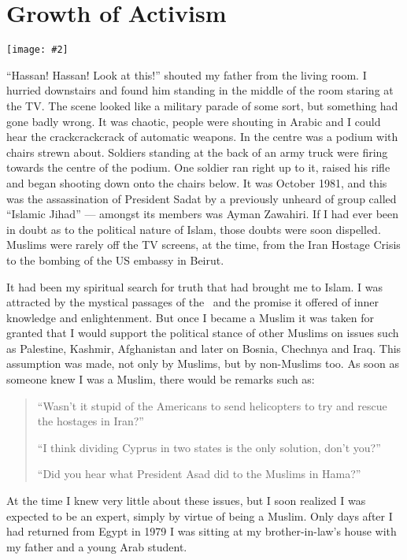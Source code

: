 \documentclass[12pt]{memoir}
\newcommand{\img}[3]{\begin{center}%
\texttt{[image: \#2]}\\{\small\em#3}%
\end{center}}
\begin{document}
\chapter{Growth of Activism}

\img{scale=0.7}{Assassination_of_Sadat.jpg}{}

“Hassan! Hassan! Look at this!”
shouted my father from the living room.
I hurried downstairs and found him standing
in the middle of the room staring at the TV.
The scene looked like a military parade of some sort,
but something had gone badly wrong.
It was chaotic, people were shouting in Arabic
and I could hear the crack\–crack\–crack of automatic weapons.
In the centre was a podium with chairs strewn about.
Soldiers standing at the back of an army truck
were firing towards the centre of the podium.
One soldier ran right up to it,
raised his rifle and began shooting down onto the chairs below.
It was October 1981, and this was the assassination of President Sadat
by a previously unheard of group called “Islamic Jihad” —
amongst its members was Ayman Zawahiri.
If I had ever been in doubt as to the political nature of Islam,
those doubts were soon dispelled.
Muslims were rarely off the TV screens, at the time,
from the Iran Hostage Crisis to the bombing of the US embassy in Beirut.

It had been my spiritual search for truth that had brought me to Islam.
I was attracted by the mystical passages of the \Quran\
and the promise it offered of inner knowledge and enlightenment.
But once I became a Muslim it was taken for granted that I would support
the political stance of other Muslims on issues such as Palestine,
Kashmir, Afghanistan and later on Bosnia, Chechnya and Iraq.
This assumption was made, not only by Muslims, but by non-Muslims too.
As soon as someone knew I was a Muslim, there would be remarks such as:

\begin{quote}
“Wasn’t it stupid of the Americans to send helicopters
to try and rescue the hostages in Iran?”

“I think dividing Cyprus in two states is the only solution, don’t you?”

“Did you hear what President Asad did to the Muslims in Hama?”
\end{quote}

At the time I knew very little about these issues,
but I soon realized I was expected to be an expert,
simply by virtue of being a Muslim.
Only days after I had returned from Egypt in 1979
I was sitting at my brother-in-law’s house
with my father and a young Arab student.
\end{document}
